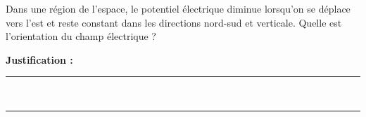 Dans une région de l'espace, le potentiel électrique diminue lorsqu'on se déplace vers l'est et reste constant dans les directions nord-sud et verticale. Quelle est l'orientation du champ électrique ?

\choices

\noindent\textbf{Justification :} \hrulefill \\[2.5ex]
\rule{\linewidth}{0.4pt} \\[2.5ex]
\rule{\linewidth}{0.4pt}
\vfill
